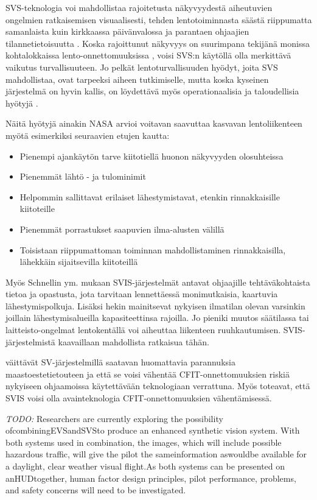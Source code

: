 \documentclass[utf8,bachelor,manualbib]{gradu3}
\begin{document}
SVS-teknologia voi mahdollistaa rajoitetusta näkyvyydestä aiheutuvien ongelmien ratkaisemisen visuaalisesti, tehden lentotoiminnasta säästä riippumatta samanlaista kuin kirkkaassa päivänvalossa ja parantaen ohjaajien tilannetietoisuutta \citep{prinzel2004}. Koska rajoittunut näkyvyys on suurimpana tekijänä monissa kohtalokkaissa lento-onnettomuuksissa \citep{boeing1996}, voisi SVS:n käytöllä olla merkittävä vaikutus turvallisuuteen. Jo pelkät lentoturvallisuuden hyödyt, joita SVS mahdollistaa, ovat tarpeeksi aiheen tutkimiselle, mutta koska kyseinen järjestelmä on hyvin kallis, on löydettävä myös operationaalisia ja taloudellisia hyötyjä \citep{prinzel2004}.

Näitä hyötyjä ainakin NASA \citeyearpar{williamsym2001} arvioi voitavan saavuttaa kasvavan lentoliikenteen myötä esimerkiksi seuraavien etujen kautta:

\begin{itemize}
\item Pienempi ajankäytön tarve kiitotiellä huonon näkyvyyden olosuhteissa
\item Pienemmät lähtö - ja tulominimit
\item Helpommin sallittavat erilaiset lähestymistavat, etenkin rinnakkaisille kiitoteille
\item Pienemmät porrastukset saapuvien ilma-alusten välillä
\item Toisistaan riippumattoman toiminnan mahdollistaminen rinnakkaisilla, lähekkäin sijaitsevilla kiitoteillä
\end{itemize} 

Myös Schnellin ym. \citeyearpar{schnellym2004} mukaan SVIS-järjestelmät antavat ohjaajille tehtäväkohtaista tietoa ja opastusta, jota tarvitaan lennettäessä monimutkaisia, kaartuvia lähestymispolkuja. Lisäksi hekin mainitsevat nykyisen ilmatilan olevan varsinkin joillain lähestymisalueilla kapasiteettinsa rajoilla. Jo pieniki muutos säätilassa tai laitteisto-ongelmat lentokentällä voi aiheuttaa liikenteen ruuhkautumisen. SVIS-järjestelmistä kaavaillaan mahdollista ratkaisua tähän. 

\cite{baileyym2007} väittävät SV-järjestelmillä saatavan huomattavia parannuksia maastoestetietouteen ja että se voisi vähentää CFIT-onnettomuuksien riskiä nykyiseen ohjaamoissa käytettävään teknologiaan verrattuna. Myös \cite{schnellym2004} toteavat, että SVIS voisi olla avainteknologia CFIT-onnettomuuksien vähentämisessä.



\emph{TODO:}
Researchers are currently exploring the possibility ofcombiningEVSandSVSto
produce an enhanced synthetic vision system. With both systems used in combination,
the images, which will include possible hazardous traffic, will give the pilot the
sameinformation aswouldbe available for a daylight, clear weather visual flight.As
both systems can be presented on anHUDtogether, human factor design principles,
pilot performance, problems, and safety concerns will need to be investigated. \citep{crawford2006}
\end{document}
